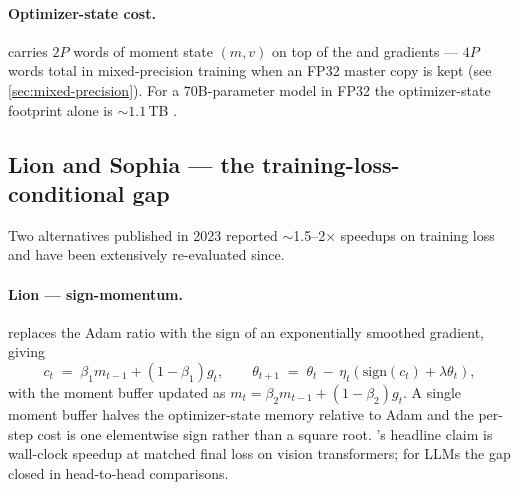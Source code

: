 \paragraph{Optimizer-state cost.}
 carries $2P$ words of moment state $(m, v)$ on top of the
 and gradients --- $4P$ words total in mixed-precision
training when an FP32 master copy is kept (see
\cref{sec:mixed-precision}). For a $70$B-parameter model in FP32 the
optimizer-state footprint alone is $\sim 1.1$\,TB
\citep[\S 2]{muon-moonlight2025}.

\subsection{Lion and Sophia --- the training-loss-conditional gap}
\label{sec:opt-lion-sophia}

Two  alternatives published in 2023 reported
$\sim$1.5--2$\times$ speedups on training loss and have been
extensively re-evaluated since.

\paragraph{Lion --- sign-momentum.}
 \citep[Chen et
al.\ 2023]{muon-moonlight2025} replaces
the Adam ratio with the sign of an exponentially smoothed gradient,
giving
\begin{equation}
c_t \;=\; \beta_1 m_{t-1} + (1 - \beta_1) g_t, \qquad
\theta_{t+1} \;=\; \theta_t \,-\, \eta_t \!\left(
   \mathrm{sign}(c_t) + \lambda \theta_t
\right),
\label{eq:lion-update}
\end{equation}
with the moment buffer updated as
$m_t = \beta_2 m_{t-1} + (1-\beta_2) g_t$. A single moment buffer
halves the optimizer-state memory relative to Adam and the per-step
cost is one elementwise sign rather than a square root. 's
headline claim is wall-clock speedup at matched final loss on vision
transformers; for LLMs the gap closed in head-to-head
comparisons.

